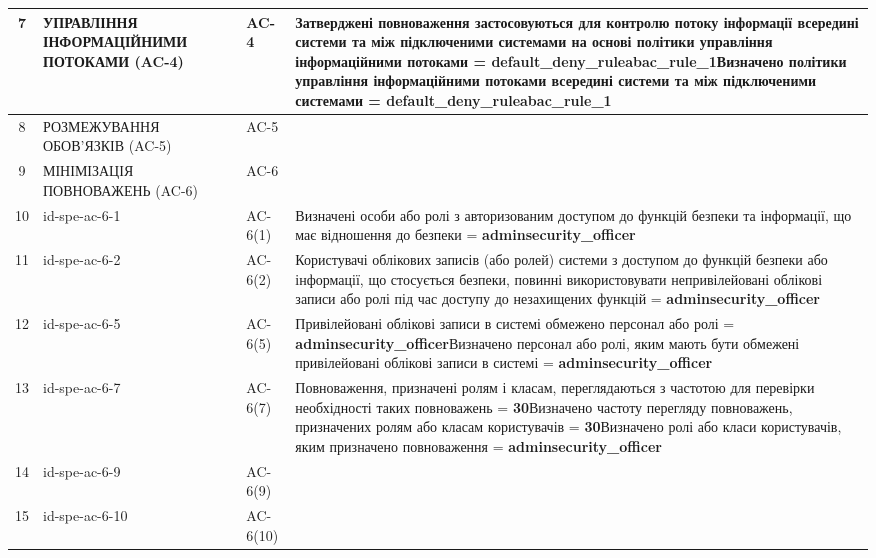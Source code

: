 \documentclass[10pt]{article}
\begin{document}
\begin{longtable}{|c|>{\raggedright\arraybackslash}p{2.5cm}|>{\raggedright\arraybackslash}p{4.5cm}|>{\raggedright\arraybackslash}p{3cm}|>{\raggedright\arraybackslash}p{4.5cm}|}
7 & УПРАВЛІННЯ ІНФОРМАЦІЙНИМИ ПОТОКАМИ (AC-4) &  & AC-4 & Затверджені повноваження застосовуються для контролю потоку інформації всередині системи та між підключеними системами на основі політики управління інформаційними потоками = \textbf{default\_\allowbreak{}deny\_\allowbreak{}ruleabac\_\allowbreak{}rule\_\allowbreak{}1}\newline Визначено політики управління інформаційними потоками всередині системи та між підключеними системами = \textbf{default\_\allowbreak{}deny\_\allowbreak{}ruleabac\_\allowbreak{}rule\_\allowbreak{}1} \\ \hline
8 & РОЗМЕЖУВАННЯ ОБОВ'ЯЗКІВ (AC-5) &  & AC-5 &  \\ \hline
9 & МІНІМІЗАЦІЯ ПОВНОВАЖЕНЬ (AC-6) &  & AC-6 &  \\ \hline
10 & id-spe-ac-6-1 &  & AC-6(1) & Визначені особи або ролі з авторизованим доступом до функцій безпеки та інформації, що має відношення до безпеки = \textbf{adminsecurity\_\allowbreak{}officer} \\ \hline
11 & id-spe-ac-6-2 &  & AC-6(2) & Користувачі облікових записів (або ролей) системи з доступом до функцій безпеки або інформації, що стосується безпеки, повинні використовувати непривілейовані облікові записи або ролі під час доступу до незахищених функцій = \textbf{adminsecurity\_\allowbreak{}officer} \\ \hline
12 & id-spe-ac-6-5 &  & AC-6(5) & Привілейовані облікові записи в системі обмежено персонал або ролі = \textbf{adminsecurity\_\allowbreak{}officer}\newline Визначено персонал або ролі, яким мають бути обмежені привілейовані облікові записи в системі = \textbf{adminsecurity\_\allowbreak{}officer} \\ \hline
13 & id-spe-ac-6-7 &  & AC-6(7) & Повноваження, призначені ролям і класам, переглядаються з частотою для перевірки необхідності таких повноважень = \textbf{30}\newline Визначено частоту перегляду повноважень, призначених ролям або класам користувачів = \textbf{30}\newline Визначено ролі або класи користувачів, яким призначено повноваження  = \textbf{adminsecurity\_\allowbreak{}officer} \\ \hline
14 & id-spe-ac-6-9 &  & AC-6(9) &  \\ \hline
15 & id-spe-ac-6-10 &  & AC-6(10) &  \\ \hline

\end{longtable}
\end{document}
